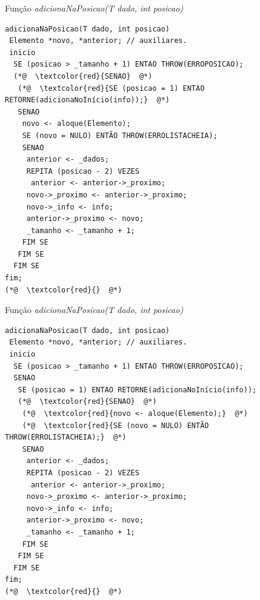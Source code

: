 \documentclass[12pt,table,xcolor={dvipsnames}]{beamer}
\begin{document}
\begin{frame}[fragile]{Função \textit{adicionaNaPosicao(T dado, int posicao)}}
\begin{lstlisting}
adicionaNaPosicao(T dado, int posicao)
 Elemento *novo, *anterior; // auxiliares.
 inicio
  SE (posicao > _tamanho + 1) ENTAO THROW(ERROPOSICAO);
  (*@  \textcolor{red}{SENAO}  @*)
   (*@  \textcolor{red}{SE (posicao = 1) ENTAO RETORNE(adicionaNoInício(info));}  @*)
   SENAO
    novo <- aloque(Elemento);
    SE (novo = NULO) ENTÃO THROW(ERROLISTACHEIA);
    SENAO
     anterior <- _dados;
     REPITA (posicao - 2) VEZES
      anterior <- anterior->_proximo;
     novo->_proximo <- anterior->_proximo;
     novo->_info <- info;
     anterior->_proximo <- novo;
     _tamanho <- _tamanho + 1;
    FIM SE
   FIM SE
  FIM SE
fim;
(*@  \textcolor{red}{}  @*)
\end{lstlisting}
\end{frame}

\begin{frame}[fragile]{Função \textit{adicionaNaPosicao(T dado, int posicao)}}
\begin{lstlisting}
adicionaNaPosicao(T dado, int posicao)
 Elemento *novo, *anterior; // auxiliares.
 inicio
  SE (posicao > _tamanho + 1) ENTAO THROW(ERROPOSICAO);
  SENAO
   SE (posicao = 1) ENTAO RETORNE(adicionaNoInício(info));
   (*@  \textcolor{red}{SENAO}  @*)
    (*@  \textcolor{red}{novo <- aloque(Elemento);}  @*)
    (*@  \textcolor{red}{SE (novo = NULO) ENTÃO THROW(ERROLISTACHEIA);}  @*)
    SENAO
     anterior <- _dados;
     REPITA (posicao - 2) VEZES
      anterior <- anterior->_proximo;
     novo->_proximo <- anterior->_proximo;
     novo->_info <- info;
     anterior->_proximo <- novo;
     _tamanho <- _tamanho + 1;
    FIM SE
   FIM SE
  FIM SE
fim;
(*@  \textcolor{red}{}  @*)
\end{lstlisting}
\end{frame}
\end{document}
